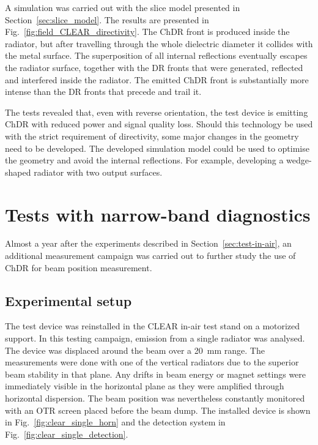 A simulation was carried out with the slice model presented in Section~\ref{sec:slice_model}. The results are presented in Fig.~\ref{fig:field_CLEAR_directivity}. The ChDR front is produced inside the radiator, but after travelling through the whole dielectric diameter it collides with the metal surface. The superposition of all internal reflections eventually escapes the radiator surface, together with the DR fronts that were generated, reflected and interfered inside the radiator. The emitted ChDR front is substantially more intense than the DR fronts that precede and trail it.

The tests revealed that, even with reverse orientation, the test device is emitting ChDR with reduced power and signal quality loss. Should this technology be used with the strict requirement of directivity, some major changes in the geometry need to be developed. The developed simulation model could be used to optimise the geometry and avoid the internal reflections. For example, developing a wedge-shaped radiator with two output surfaces.

















\newpage

\section[Tests with narrow-band diagnostics]{Tests with narrow-band diagnostics}\label{sec:narrowband-diagnostic}

Almost a year after the experiments described in Section~\ref{sec:test-in-air}, an additional measurement campaign was carried out to further study the use of ChDR for beam position measurement. 


\subsection{Experimental setup}

The test device was reinstalled in the CLEAR in-air test stand on a motorized support. In this testing campaign, emission from a single radiator was analysed. The device was displaced around the beam over a 20~mm range. The measurements were done with one of the vertical radiators due to the superior beam stability in that plane. Any drifts in beam energy or magnet settings were immediately visible in the horizontal plane as they were amplified through horizontal dispersion. The beam position was nevertheless constantly monitored with an OTR screen placed before the beam dump. The installed device is shown in Fig.~\ref{fig:clear_single_horn} and the detection system in Fig.~\ref{fig:clear_single_detection}.



